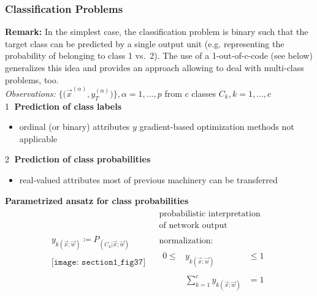 \subsubsection{Classification Problems} \label{sec:class-problems}
\textbf{Remark:} In the simplest case, the classification problem is
binary such that the target class can be predicted by a single output
unit (e.g. representing the probability of belonging to class 1
vs.\ 2). The use of a 1-out-of-c-code (see below) generalizes this idea and 
provides an approach allowing to deal with multi-class problems, too.
\\
\emph{Observations:} $\Big\{ \Big( \vec{x}^{(\alpha)}, y_T^{(\alpha)} \Big) \Big\}, \alpha = 1, \ldots, p$ \hfill from $c$ classes $C_k, k = 1, \ldots, c$
\\
\textcircled{1} {\bf Prediction of class labels}
\begin{itemize}
	\item ordinal (or binary) attributes $y$
	\itr gradient-based optimization methods not applicable
\end{itemize}
\textcircled{2} {\bf Prediction of class probabilities}
\begin{itemize}
	\item real-valued attributes
	\itr most of previous machinery can be transferred
\end{itemize}
{\bf Parametrized ansatz for class probabilities}
\\
\[ \begin{array}{ll}
	\begin{array}{l}
		y_{k (\vec{x};\vec{w})} \coloneqq P_{(C_k|\vec{x};\vec{w})}\\\\
		\texttt{[image: section1\_fig37]}
	\end{array} &
	\begin{array}{l}
		\text{probabilistic interpretation} \\
		\text{of network output}\\\\
		\text{normalization:} \\\\
		\begin{array}{lcl}
			0 \leq & y_{k (\vec{x};\vec{w})} & \leq 1 \\\\
			       & \sum\limits_{k=1}^c 
			       		y_{k (\vec{x};\vec{w})} & = 1
		\end{array}
	\end{array}
\end{array} \]
